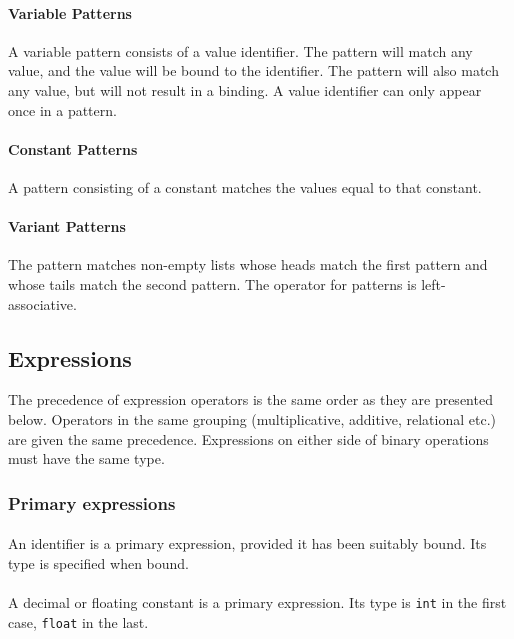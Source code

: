 \paragraph{Variable Patterns}
A variable pattern consists of a value identifier. The pattern will match any value, and the value will be bound to the identifier. The pattern \term{\_} will also match any value, but will not result in a binding. A value identifier can only appear once in a pattern.

\paragraph{Constant Patterns}
A pattern consisting of a constant matches the values equal to that constant.

\paragraph{Variant Patterns}
The pattern  \term{::}  matches non-empty lists whose heads match the first pattern and whose tails match the second pattern. The \term{::} operator for patterns is left-associative.

\subsection{Expressions}

The precedence of expression operators is the same order as they are presented below. Operators in the same grouping (multiplicative, additive, relational etc.) are given the same precedence. Expressions on either side of binary operations must have the same type. 

\subsubsection{Primary expressions}

\paragraph{}
An identifier is a primary expression, provided it has been suitably bound. Its type is specified when bound. 

\paragraph{}
A decimal or floating constant is a primary expression. Its type is \texttt{int} in the first case, \texttt{float} in the last. 

